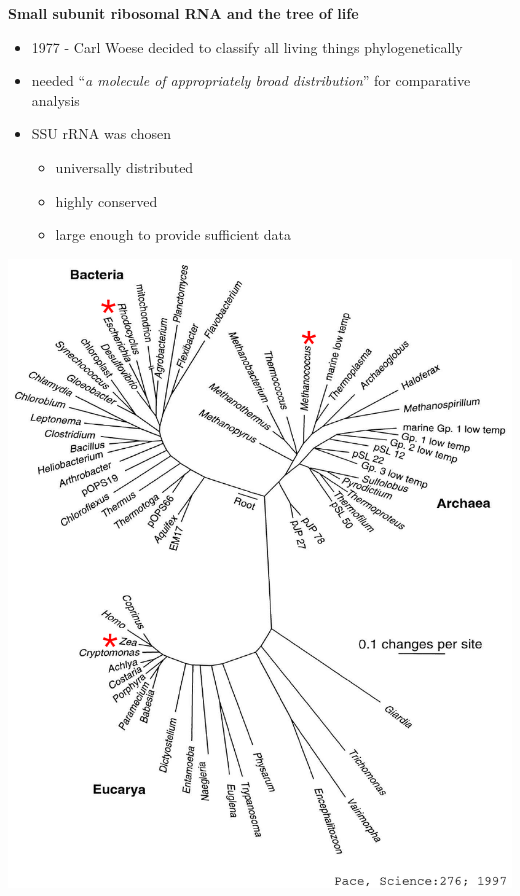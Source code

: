 \documentclass[landscape]{slides}
\begin{document}
\begin{slide}
\begin{center}

\textbf{Small subunit ribosomal RNA and the tree of life}
\end{center}
\medskip
\begin{minipage}{5.2in}
\small

\begin{itemize}
\item
1977 - Carl Woese decided to classify all living things phylogenetically
\item
needed ``\emph{a molecule of appropriately broad distribution}'' for
comparative analysis
\item
SSU rRNA was chosen
\begin{itemize}
  \item
    universally distributed
  \item
    highly conserved 
  \item
    large enough to provide sufficient data%
\end{itemize}
\end{itemize}

\vspace{2.7in}
\end{minipage}
\hspace{0.1in}
\begin{minipage}{5.5in}
\includegraphics[width=5.5in]{figs/bigtol}
\end{minipage}  

\end{slide}
\end{document}
